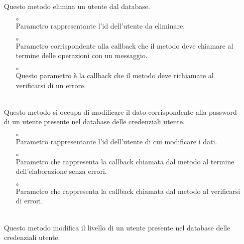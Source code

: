 \begin{itemize}
\begin{itemize}
\end{itemize}
\item[]  \\ Questo metodo elimina un utente dal database.
\begin{itemize}\addtolength{\itemsep}{-0.5\baselineskip}
\item[$\circ$]  \\ Parametro rappresentante l'id dell'utente da eliminare.
\item[$\circ$]  \\ Parametro corrispondente alla callback che il metodo deve chiamare al termine delle operazioni con un messaggio.
\item[$\circ$]  \\ Questo parametro è la callback che il metodo deve richiamare al verificarsi di un errore.
\end{itemize}
\item[]  \\ Questo metodo si occupa di modificare il dato corrispondente alla password di un utente presente nel database delle credenziali utente.
\begin{itemize}\addtolength{\itemsep}{-0.5\baselineskip}
\item[$\circ$]  \\ Parametro rappresentante l'id dell'utente di cui modificare i dati.
\item[$\circ$]  \\ Parametro che rappresenta la callback chiamata dal metodo al termine dell'elaborazione senza errori.
\item[$\circ$]  \\ Parametro che rappresenta la callback chiamata dal metodo al verificarsi di errori.
\end{itemize}
\item[]  \\ Questo metodo modifica il livello di un utente presente nel database delle credenziali utente.
\begin{itemize}\addtolength{\itemsep}{-0.5\baselineskip}

\end{itemize}
\end{itemize}
